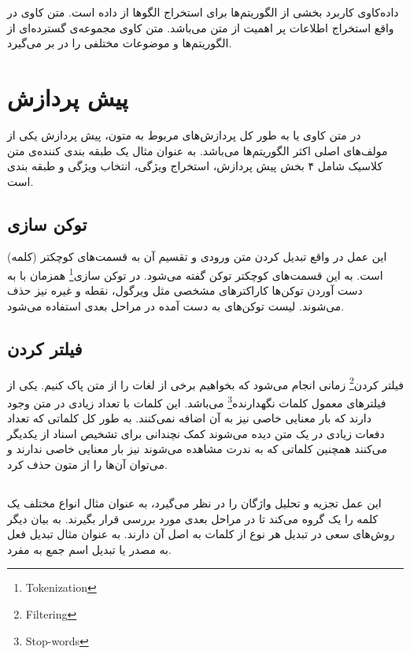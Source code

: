 \documentclass[12pt, a4paper, oneside]{report}
\begin{document}
داده‌کاوی کاربرد بخشی از الگوریتم‌ها برای استخراج الگو‌ها از داده است. متن کاوی در واقع استخراج اطلاعات پر اهمیت از
متن می‌باشد. متن کاوی مجموعه‌ی گسترده‌ای از الگوریتم‌ها و موضوعات مختلفی را در بر می‌گیرد\cite{c9d4fbeac7324056bed5d1cb262a7268}.

\section{پیش پردازش}

در متن کاوی یا به طور کل پردازش‌های مربوط به متون، پیش پردازش یکی از مولف‌های اصلی اکثر الگوریتم‌ها می‌باشد.
به عنوان مثال یک طبقه بندی کننده‌ی متن کلاسیک شامل ۴ بخش پیش پردازش، استخراج ویژگی، انتخاب ویژگی و طبقه بندی است\cite{DBLP:journals/corr/AllahyariPASTGK17a}.

\subsection{توکن سازی}

این عمل در واقع تبدیل کردن متن ورودی و تقسیم آن به قسمت‌های کوچکتر
(کلمه)
است. به این قسمت‌های کوچکتر توکن گفته می‌شود. در
توکن سازی\footnote{Tokenization}
همزمان با به دست آوردن توکن‌ها کاراکتر‌های مشخصی مثل ویرگول، نقطه و غیره نیز حذف می‌شوند.
لیست توکن‌های به دست آمده در مراحل بعدی استفاده می‌شود\cite{DBLP:journals/corr/AllahyariPASTGK17a}.

\subsection{فیلتر کردن}

فیلتر کردن\footnote{Filtering}
زمانی انجام می‌شود که بخواهیم برخی از لغات را از متن پاک کنیم. یکی از فیلتر‌های معمول
کلمات نگهدارنده\footnote{Stop-words}
می‌باشد. این کلمات با تعداد زیادی در متن وجود دارند که بار معنایی خاصی نیز به آن اضافه نمی‌کنند.
به طور کل کلماتی که تعداد دفعات زیادی در یک متن دیده می‌شوند کمک نچندانی برای تشخیص اسناد از یکدیگر می‌کنند
همچنین کلماتی که به ندرت مشاهده می‌شوند نیز بار معنایی خاصی ندارند و می‌توان آن‌ها را از متون حذف کرد\cite{DBLP:journals/corr/AllahyariPASTGK17a}.

\subsection{}

این عمل تجزیه و تحلیل واژگان را در نظر می‌گیرد، به عنوان مثال انواع مختلف یک کلمه را یک گروه می‌کند تا در مراحل بعدی
مورد بررسی قرار بگیرند. به بیان دیگر روش‌های
سعی در تبدیل هر نوع از کلمات به اصل آن دارند. به عنوان مثال تبدیل فعل به مصدر یا تبدیل اسم جمع به مفرد\cite{DBLP:journals/corr/AllahyariPASTGK17a}.
\end{document}
